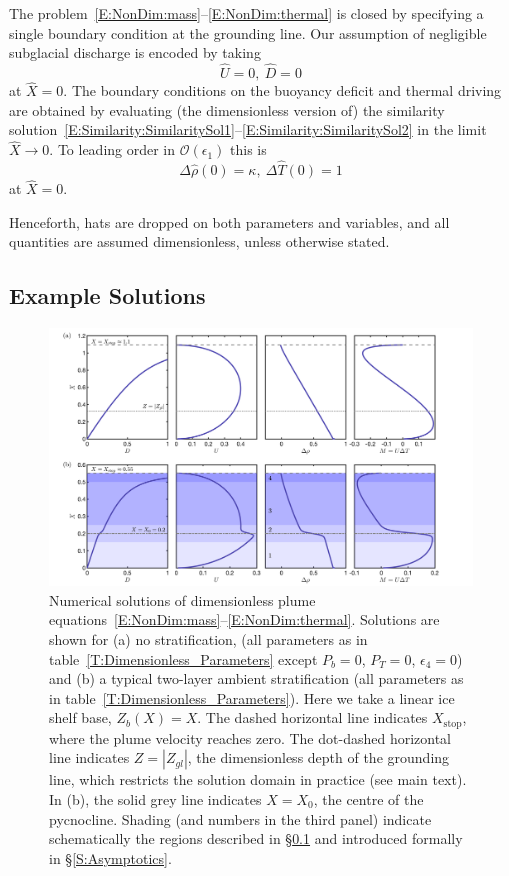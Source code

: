 \documentclass[openacc]{rsproca_new}%
\newcommand{\order}[1]{\mathcal{O}(#1)}
\newcommand{\epsone}{\epsilon_{1}} %
\newcommand{\epsfour}{\epsilon_{4}}
\newcommand{\Pt}{\textit{P}_T}
\begin{document}
The problem~\eqref{E:NonDim:mass}--\eqref{E:NonDim:thermal} is closed by specifying a single boundary condition at the grounding line. Our assumption of negligible subglacial discharge is encoded by taking
\begin{equation}\label{E:NonDim:IC1}
\hat{U} =0,~\hat{D} = 0
\end{equation}
at $\hat{X} = 0$. The boundary conditions on the buoyancy deficit and thermal driving are obtained by evaluating (the dimensionless version of) the similarity solution~\eqref{E:Similarity:SimilaritySol1}--\eqref{E:Similarity:SimilaritySol2} in the limit $\hat{X} \to 0$. To leading order in $\order{\epsone}$ this is
\begin{equation}\label{E:NonDim:IC2}
  \Delta\hat{\rho}(0) = \kappa,~\Delta \hat{T}(0) = 1  
\end{equation}
at $\hat{X} = 0$.

Henceforth, hats are dropped on both parameters and variables, and all quantities are assumed dimensionless, unless otherwise stated.

\subsection{Example Solutions}\label{S:ExampleSolutions}

\begin{figure}
\centering
\includegraphics[width = \textwidth]{Submitted_PRSA/make_plots/plots/figure3.png}
\caption{Numerical solutions of dimensionless plume equations~\eqref{E:NonDim:mass}--\eqref{E:NonDim:thermal}. Solutions are shown for (a) no stratification, (all parameters as in table~\ref{T:Dimensionless_Parameters} except $P_b = 0$, $\Pt = 0$, $\epsfour = 0$) and (b)  a typical two-layer ambient stratification (all parameters as in table~\ref{T:Dimensionless_Parameters}). Here we take a linear ice shelf base, $Z_b(X) = X$. The dashed horizontal line indicates $X_{\text{stop}}$, where the plume velocity reaches zero. The dot-dashed horizontal line indicates $Z = |Z_{gl}|$, the dimensionless depth of the grounding line, which restricts the solution domain in practice (see main text). In (b), the solid grey line indicates $X = X_0$, the centre of the pycnocline. Shading (and numbers in the third panel) indicate schematically the regions described in \S\ref{S:ExampleSolutions} and introduced formally in \S\ref{S:Asymptotics}. }\label{fig:ExampleSols}
\end{figure}
\end{document}

